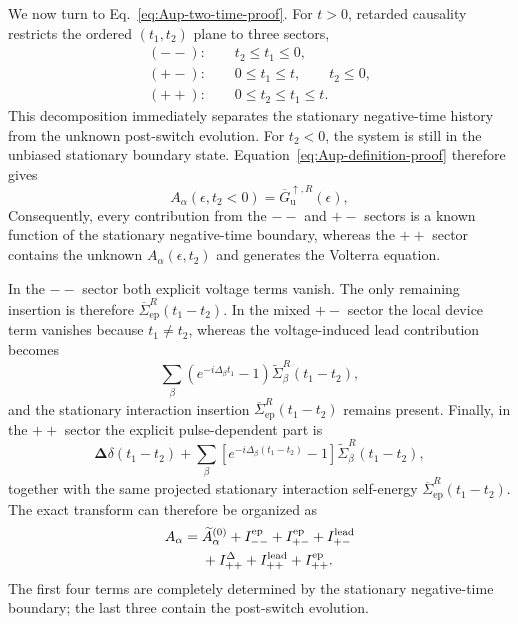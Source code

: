 \documentclass[
 reprint,
 superscriptaddress,
 amsmath,amssymb,
 aps,prb,
 longbibliography,
 floatfix
]{revtex4-2}
\newcommand{\ep}{\mathrm{ep}}
\newcommand{\barSigma}{\overline{\Sigma}}
\begin{document}
We now turn to Eq.~\eqref{eq:Aup-two-time-proof}. For $t>0$, retarded causality restricts the ordered $(t_1,t_2)$ plane to three sectors,
\begin{equation*}
\begin{gathered}
(--):\qquad t_2\le t_1\le0,
\\
(+-):\qquad 0\le t_1\le t,\qquad t_2\le0,
\\
(++):\qquad 0\le t_2\le t_1\le t.
\end{gathered}
\end{equation*}
This decomposition immediately separates the stationary negative-time history from the unknown post-switch evolution. For $t_2<0$, the system is still in the unbiased stationary boundary state. Equation~\eqref{eq:Aup-definition-proof} therefore gives
\begin{equation*}
A_\alpha(\epsilon,t_2<0)
=
\overline G_{\mathrm u}^{\uparrow,R}(\epsilon),
\end{equation*}
Consequently, every contribution from the $--$ and $+-$ sectors is a known function of the stationary negative-time boundary, whereas the $++$ sector contains the unknown $A_\alpha(\epsilon,t_2)$ and generates the Volterra equation. 

In the $--$ sector both explicit voltage terms vanish. The only remaining insertion is therefore $\barSigma_{\ep}^R(t_1-t_2)$. In the mixed $+-$ sector the local device term vanishes because $t_1\neq t_2$, whereas the voltage-induced lead contribution becomes
\begin{equation*}
\sum_\beta
\left(
e^{-i\Delta_\beta t_1}-1
\right)
\widetilde\Sigma_\beta^R(t_1-t_2),
\end{equation*}
and the stationary interaction insertion $\barSigma_{\ep}^R(t_1-t_2)$ remains present. Finally, in the $++$ sector the explicit pulse-dependent part is
\begin{equation*}
\bm\Delta\delta(t_1-t_2)
+
\sum_\beta
\left[
e^{-i\Delta_\beta(t_1-t_2)}-1
\right]
\widetilde\Sigma_\beta^R(t_1-t_2),
\end{equation*}
together with the same projected stationary interaction self-energy $\barSigma_{\ep}^R(t_1-t_2)$. The exact transform can therefore be organized as
\begin{equation*}
\begin{aligned}
A_\alpha
={}&
\widetilde A_\alpha^{(0)}
+
I_{--}^{\ep}
+
I_{+-}^{\ep}
+
I_{+-}^{\rm lead}
\\
&+
I_{++}^{\Delta}
+
I_{++}^{\rm lead}
+
I_{++}^{\ep}.
\end{aligned}
\end{equation*}
The first four terms are completely determined by the stationary negative-time boundary; the last three contain the post-switch evolution.
\end{document}
